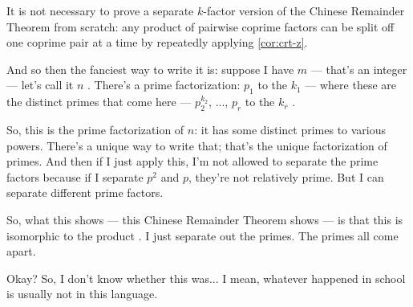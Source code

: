 \begin{content}

\begin{steps}
It is not necessary to prove a separate $k$-factor version of the Chinese Remainder Theorem from scratch: any product of pairwise coprime factors can be split off one coprime pair at a time by repeatedly applying \cref{cor:crt-z}.
\end{steps}
\end{content}

\begin{speech}[00:16:01 - 00:16:40]
And so then the fanciest way to write it is: suppose I have $m$  --- that's an integer --- let's call it $n$ . There's a prime factorization: $p_1$ to the $k_1$  --- where these are the distinct primes that come here --- $p_2^{k_2}$, ..., $p_r$ to the $k_r$ .

So, this is the prime factorization of $n$: it has some distinct primes to various powers. There's a unique way to write that; that's the unique factorization of primes. And then if I just apply this, I'm not allowed to separate the prime factors because if I separate $p^2$ and $p$, they're not relatively prime. But I can separate different prime factors.
\end{speech}

\begin{speech}[00:16:40 - 00:17:15]
So, what this shows --- this Chinese Remainder Theorem shows --- is that this  is isomorphic to the product . I just separate out the primes. The primes all come apart.

Okay? So, I don't know whether this was... I mean, whatever happened in school is usually not in this language.
\end{speech}


